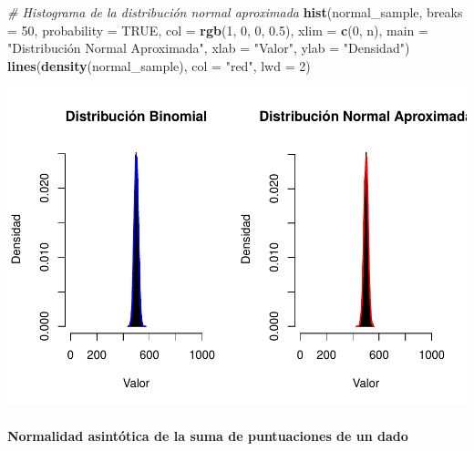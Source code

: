 \documentclass[
]{article}
\newenvironment{Shaded}{\begin{snugshade}}{\end{snugshade}}
\newcommand{\AttributeTok}[1]{\textcolor[rgb]{0.13,0.29,0.53}{#1}}
\newcommand{\CommentTok}[1]{\textcolor[rgb]{0.56,0.35,0.01}{\textit{#1}}}
\newcommand{\ConstantTok}[1]{\textcolor[rgb]{0.56,0.35,0.01}{#1}}
\newcommand{\DecValTok}[1]{\textcolor[rgb]{0.00,0.00,0.81}{#1}}
\newcommand{\FloatTok}[1]{\textcolor[rgb]{0.00,0.00,0.81}{#1}}
\newcommand{\FunctionTok}[1]{\textcolor[rgb]{0.13,0.29,0.53}{\textbf{#1}}}
\newcommand{\NormalTok}[1]{#1}
\newcommand{\StringTok}[1]{\textcolor[rgb]{0.31,0.60,0.02}{#1}}
\begin{document}
\begin{Shaded}
\begin{Highlighting}[]
\CommentTok{\# Histograma de la distribución normal aproximada}
\FunctionTok{hist}\NormalTok{(normal\_sample, }\AttributeTok{breaks =} \DecValTok{50}\NormalTok{, }\AttributeTok{probability =} \ConstantTok{TRUE}\NormalTok{, }
     \AttributeTok{col =} \FunctionTok{rgb}\NormalTok{(}\DecValTok{1}\NormalTok{, }\DecValTok{0}\NormalTok{, }\DecValTok{0}\NormalTok{, }\FloatTok{0.5}\NormalTok{), }\AttributeTok{xlim =} \FunctionTok{c}\NormalTok{(}\DecValTok{0}\NormalTok{, n), }
     \AttributeTok{main =} \StringTok{"Distribución Normal Aproximada"}\NormalTok{, }\AttributeTok{xlab =} \StringTok{"Valor"}\NormalTok{, }
     \AttributeTok{ylab =} \StringTok{"Densidad"}\NormalTok{)}
\FunctionTok{lines}\NormalTok{(}\FunctionTok{density}\NormalTok{(normal\_sample), }\AttributeTok{col =} \StringTok{"red"}\NormalTok{, }\AttributeTok{lwd =} \DecValTok{2}\NormalTok{)}
\end{Highlighting}
\end{Shaded}

\includegraphics{FundamentosInferenciaEstadistica_files/figure-latex/unnamed-chunk-14-1.pdf}

\paragraph{Normalidad asintótica de la suma de puntuaciones de un dado}\label{normalidad-asintuxf3tica-de-la-suma-de-puntuaciones-de-un-dado}
\end{document}
